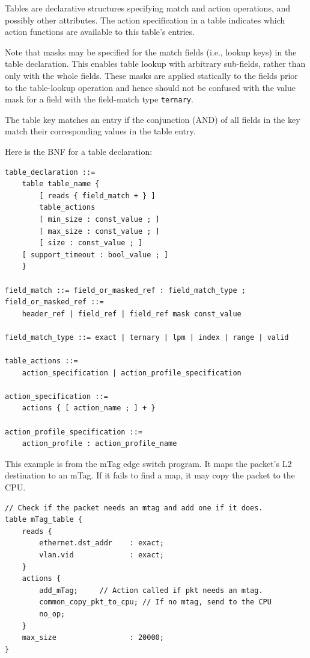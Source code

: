 \documentclass[12pt]{article}
\begin{document}
Tables are declarative structures specifying match and action operations, and
possibly other attributes. The action specification in a table indicates which
action functions are available to this table's entries.

Note that masks may be specified for the match fields (i.e., lookup keys) in the 
table declaration. This enables table lookup with arbitrary sub-fields, rather 
than only with the whole fields. These masks are applied statically to the fields
prior to the table-lookup operation and hence should not be confused with 
the value mask for a field with the field-match type \texttt{ternary}.

The table key matches an entry if the conjunction (AND) of all fields in
the key match their corresponding values in the table entry.

Here is the BNF for a table declaration:

\begin{lstlisting}[style=BNFstyle]
table_declaration ::=
    table table_name {
        [ reads { field_match + } ]
        table_actions
        [ min_size : const_value ; ]
        [ max_size : const_value ; ]
        [ size : const_value ; ]
	[ support_timeout : bool_value ; ]
    }

field_match ::= field_or_masked_ref : field_match_type ;
field_or_masked_ref ::= 
    header_ref | field_ref | field_ref mask const_value

field_match_type ::= exact | ternary | lpm | index | range | valid

table_actions ::= 
    action_specification | action_profile_specification

action_specification ::= 
    actions { [ action_name ; ] + }

action_profile_specification ::= 
    action_profile : action_profile_name
\end{lstlisting}

This example is from the mTag edge switch program.  It maps the packet's 
L2 destination to an mTag. If it fails to find a map, it may copy the packet 
to the CPU.

\begin{lstlisting}[style=P4style]
// Check if the packet needs an mtag and add one if it does.
table mTag_table {
    reads {
        ethernet.dst_addr    : exact;
        vlan.vid             : exact;
    }
    actions {
        add_mTag;     // Action called if pkt needs an mtag.
        common_copy_pkt_to_cpu; // If no mtag, send to the CPU
        no_op;
    }
    max_size                 : 20000;
}
\end{lstlisting}
\end{document}
